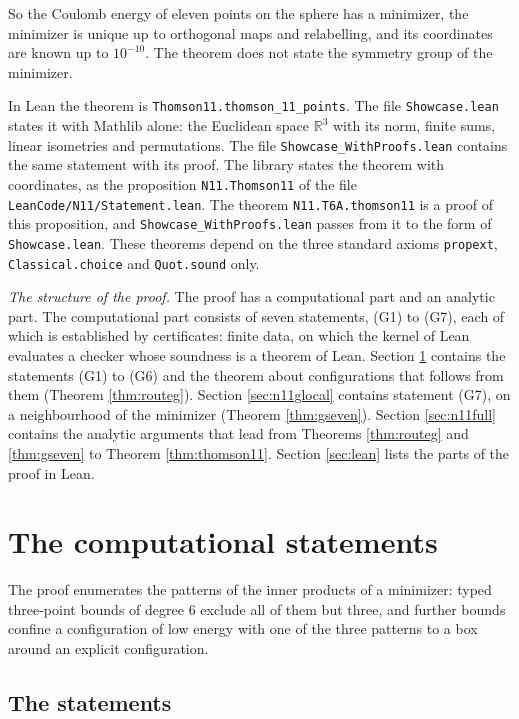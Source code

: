 \documentclass[reqno,a4paper,11pt]{amsart}
\numberwithin{equation}{section}
\def\R{{\mathbb R}}
\newcommand{\lean}[1]{\texttt{#1}}
\newcommand{\file}[1]{\nolinkurl{#1}}
\begin{document}
So the Coulomb energy of eleven points on the sphere has a minimizer, the minimizer is unique up to orthogonal maps and relabelling, and its coordinates are known up to $10^{-10}$. The theorem does not state the symmetry group of the minimizer.

{\sloppy In Lean the theorem is \lean{Thomson11.thomson\_11\_points}. The file \file{Showcase.lean} states it with Mathlib alone: the Euclidean space $\R^3$ with its norm, finite sums, linear isometries and permutations. The file \file{Showcase_WithProofs.lean} contains the same statement with its proof. The library states the theorem with coordinates, as the proposition \lean{N11.Thomson11} of the file \file{LeanCode/N11/Statement.lean}. The theorem \lean{N11.T6A.thomson11} is a proof of this proposition, and \file{Showcase_WithProofs.lean} passes from it to the form of \file{Showcase.lean}. These theorems depend on the three standard axioms \lean{propext}, \lean{Classical.choice} and \lean{Quot.sound} only.\par}

\emph{The structure of the proof.} The proof has a computational part and an analytic part. The computational part consists of seven statements, (G1) to (G7), each of which is established by certificates: finite data, on which the kernel of Lean evaluates a checker whose soundness is a theorem of Lean. Section \ref{sec:n11g} contains the statements (G1) to (G6) and the theorem about configurations that follows from them (Theorem \ref{thm:routeg}). Section \ref{sec:n11glocal} contains statement (G7), on a neighbourhood of the minimizer (Theorem \ref{thm:gseven}). Section \ref{sec:n11full} contains the analytic arguments that lead from Theorems \ref{thm:routeg} and \ref{thm:gseven} to Theorem \ref{thm:thomson11}. Section \ref{sec:lean} lists the parts of the proof in Lean.

\section{The computational statements}\label{sec:n11g}

The proof enumerates the patterns of the inner products of a minimizer: typed three-point bounds of degree $6$ exclude all of them but three, and further bounds confine a configuration of low energy with one of the three patterns to a box around an explicit configuration.

\subsection{The statements}
\end{document}
